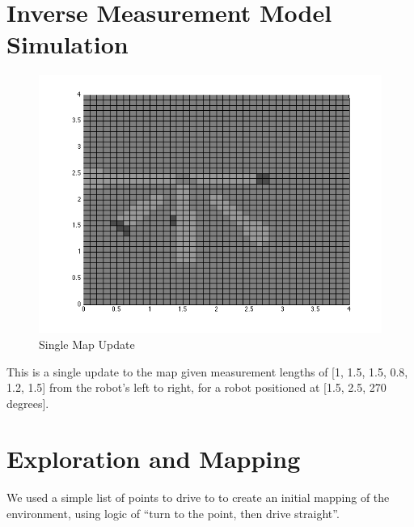 \documentclass[12pt]{article}
\begin{document}
\newpage
\singlespacing
\section{Inverse Measurement Model Simulation}
\setlength{\parindent}{1cm}

\begin{figure}[ht]
\hspace{0.5cm}
\centering
\includegraphics[scale=0.5]{Pictures/question2.png}
\caption{Single Map Update}
\end{figure}

This is a single update to the map given measurement lengths of [1, 1.5, 1.5, 0.8, 1.2, 1.5] from the robot’s left to right, for a robot positioned at [1.5, 2.5, 270 degrees].

\newpage
\singlespacing
\section{Exploration and Mapping}
\setlength{\parindent}{1cm}

We used a simple list of points to drive to to create an initial mapping of the environment, using logic of “turn to the point, then drive straight”.
\end{document}
